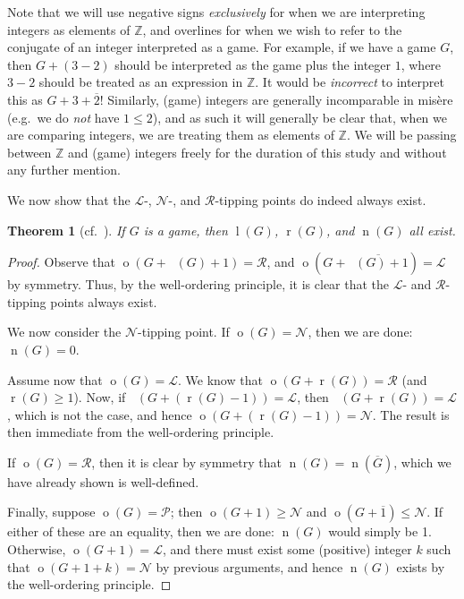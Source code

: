 \documentclass[11pt]{article}
\newtheorem{theorem}{Theorem}[section]
\theoremstyle{definition}
\DeclareMathOperator{\outcome}{o}
\DeclareMathOperator{\outcomeL}{o_L}
\DeclareMathOperator{\outcomeR}{o_R}
\DeclareMathOperator{\birth}{\tilde{b}}
\DeclareMathOperator{\ltp}{l}
\DeclareMathOperator{\ntp}{n}
\DeclareMathOperator{\rtp}{r}
\begin{document}
Note that we will use negative signs \emph{exclusively} for when we are
interpreting integers as elements of $\mathbb{Z}$, and overlines for when we
wish to refer to the conjugate of an integer interpreted as a game. For
example, if we have a game $G$, then $G+(3-2)$ should be interpreted as the
game plus the integer $1$, where $3-2$ should be treated as an expression in
$\mathbb{Z}$. It would be \emph{incorrect} to interpret this as
$G+3+\overline{2}$! Similarly, (game) integers are generally incomparable in
mis\`ere (e.g.\ we do \emph{not} have $1\leq2$), and as such it will generally
be clear that, when we are comparing integers, we are treating them as elements
of $\mathbb{Z}$. We will be passing between $\mathbb{Z}$ and (game) integers
freely for the duration of this study and without any further mention.

We now show that the $\mathscr{L}$-, $\mathscr{N}$-, and $\mathscr{R}$-tipping
points do indeed always exist.

\begin{theorem}[cf.\ {\cite[pp.~5--6]{milley.renault:invertible}}]
    \label{tipping-point-existence}
    If $G$ is a game, then $\ltp(G)$, $\rtp(G)$, and $\ntp(G)$ all exist.
\end{theorem}

\begin{proof}
    Observe that $\outcome(G+\birth(G)+1)=\mathscr{R}$, and
    $\outcome(G+\overline{\birth(G)+1})=\mathscr{L}$ by symmetry. Thus, by the
    well-ordering principle, it is clear that the $\mathscr{L}$- and
    $\mathscr{R}$-tipping points always exist.

    We now consider the $\mathscr{N}$-tipping point. If
    $\outcome(G)=\mathscr{N}$, then we are done: $\ntp(G)=0$.

    Assume now that $\outcome(G)=\mathscr{L}$. We know that
    $\outcome(G+\rtp(G))=\mathscr{R}$ (and $\rtp(G)\geq1$). Now, if
    $\outcomeR(G+(\rtp(G)-1))=\mathscr{L}$, then
    $\outcomeL(G+\rtp(G))=\mathscr{L}$, which is not the case, and hence
    $\outcome(G+(\rtp(G)-1))=\mathscr{N}$. The result is then immediate from
    the well-ordering principle.

    If $\outcome(G)=\mathscr{R}$, then it is clear by symmetry that
    $\ntp(G)=\ntp(\overline{G})$, which we have already shown is well-defined.

    Finally, suppose $\outcome(G)=\mathscr{P}$; then
    $\outcome(G+1)\geq\mathscr{N}$ and
    $\outcome(G+\overline{1})\leq\mathscr{N}$. If either of these are an
    equality, then we are done: $\ntp(G)$ would simply be 1. Otherwise,
    $\outcome(G+1)=\mathscr{L}$, and there must exist some (positive) integer
    $k$ such that $\outcome(G+1+k)=\mathscr{N}$ by previous arguments, and
    hence $\ntp(G)$ exists by the well-ordering principle.
\end{proof}
\end{document}
